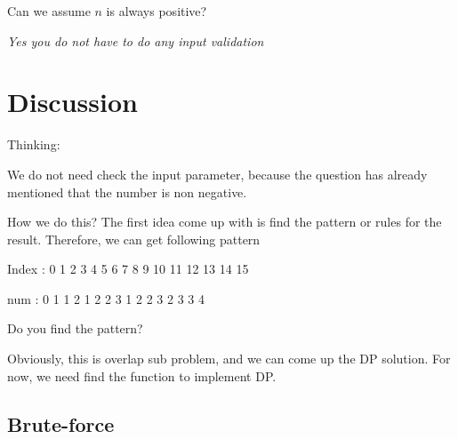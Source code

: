 \begin{QandA}
	\item Can we assume $n$ is always positive?
	\begin{answered}
		\textit{Yes you do not have to do any input validation}
	\end{answered}
	
\end{QandA}

\section{Discussion}
\label{count_bits:sec:discussion}


Thinking:

We do not need check the input parameter, because the question has already mentioned that the number is non negative.

How we do this? The first idea come up with is find the pattern or rules for the result. Therefore, we can get following pattern

Index : 0 1 2 3 4 5 6 7 8 9 10 11 12 13 14 15

num : 0 1 1 2 1 2 2 3 1 2 2 3 2 3 3 4

Do you find the pattern?

Obviously, this is overlap sub problem, and we can come up the DP solution. For now, we need find the function to implement DP.

\subsection{Brute-force}
\label{count_bits:sec:bruteforce}

\begin{minipage}{\linewidth}
	
\end{minipage}

